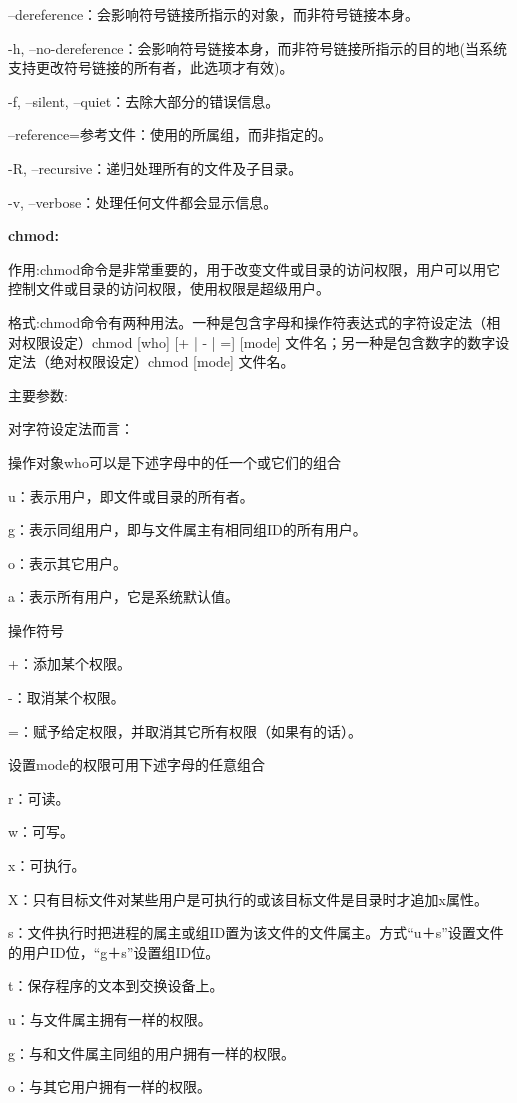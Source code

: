 --dereference：会影响符号链接所指示的对象，而非符号链接本身。

-h, --no-dereference：会影响符号链接本身，而非符号链接所指示的目的地(当系统支持更改符号链接的所有者，此选项才有效)。

-f, --silent, --quiet：去除大部分的错误信息。

--reference=参考文件：使用的所属组，而非指定的。

-R, --recursive：递归处理所有的文件及子目录。

-v, --verbose：处理任何文件都会显示信息。

\textbf{chmod:}

作用:chmod命令是非常重要的，用于改变文件或目录的访问权限，用户可以用它控制文件或目录的访问权限，使用权限是超级用户。

格式:chmod命令有两种用法。一种是包含字母和操作符表达式的字符设定法（相对权限设定）chmod [who] [+ | - | =] [mode] 文件名；另一种是包含数字的数字设定法（绝对权限设定）chmod [mode] 文件名。

主要参数:

对字符设定法而言：

操作对象who可以是下述字母中的任一个或它们的组合

u：表示用户，即文件或目录的所有者。

g：表示同组用户，即与文件属主有相同组ID的所有用户。

o：表示其它用户。

a：表示所有用户，它是系统默认值。

操作符号

+：添加某个权限。

-：取消某个权限。

=：赋予给定权限，并取消其它所有权限（如果有的话）。

设置mode的权限可用下述字母的任意组合

r：可读。

w：可写。

x：可执行。

X：只有目标文件对某些用户是可执行的或该目标文件是目录时才追加x属性。

s：文件执行时把进程的属主或组ID置为该文件的文件属主。方式“u＋s”设置文件的用户ID位，“g＋s”设置组ID位。

t：保存程序的文本到交换设备上。

u：与文件属主拥有一样的权限。

g：与和文件属主同组的用户拥有一样的权限。

o：与其它用户拥有一样的权限。


